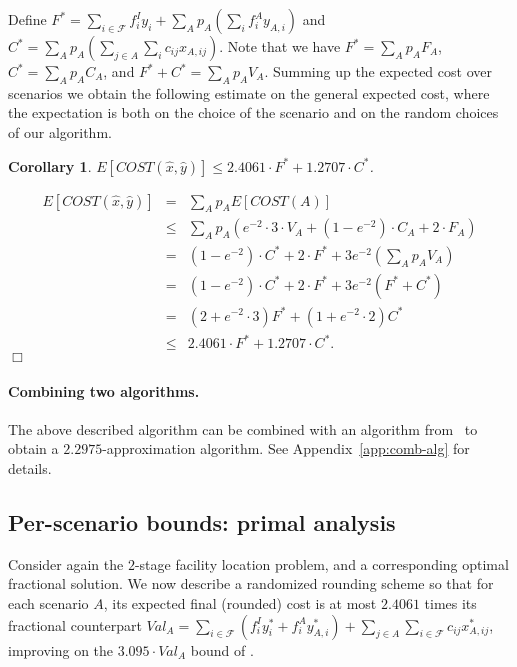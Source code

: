 \documentclass[11pt]{article}
\newtheorem{corollary}[theorem]{\indent Corollary}
\newcommand{\qed}{\nopagebreak \hfill $\Box$}
\newenvironment{proof}{\par \noindent {\em Proof:}}{\qed \par}
\newcommand{\F}{\mathcal{F}}
\begin{document}
Define $F^* = \sum_{i \in \mathcal{F}} f_i^I y_i +
\sum_A p_A (\sum_i f_i^A y_{A,i})$
and $C^* = \sum_A p_A (\sum_{j \in A} \sum_i c_{ij} x_{A,ij})$.
Note that we have $F^* = \sum_A p_A F_A$, $C^* = \sum_A p_A C_A$, and
$F^*+C^* = \sum_A p_A V_A$.
Summing up the expected cost over scenarios we obtain the following
estimate on the general expected cost, where the expectation is both 
on the choice of the scenario and on the random choices of our algorithm.

\begin{corollary}
 $E[COST(\hat{x},\hat{y})] \leq 2.4061 \cdot F^* + 1.2707 \cdot C^*$.
\end{corollary}

\begin{proof}
\begin{eqnarray*}
 E[COST(\hat{x},\hat{y})]& = & \sum_A p_A E[COST(A)]\\
 & \leq & \sum_A p_A\left( e^{-2} \cdot 3 \cdot V_A + (1-e^{-2}) \cdot C_A + 2 \cdot F_A \right)\\
 & = & (1-e^{-2}) \cdot C^* + 2 \cdot F^* + 3e^{-2} (\sum_A p_A V_A)\\
 & = & (1-e^{-2}) \cdot C^* + 2 \cdot F^* + 3e^{-2} (F^*+C^*)\\
 & = & (2 + e^{-2} \cdot 3) F^* + (1 + e^{-2} \cdot 2) C^* \\
 & \leq & 2.4061 \cdot F^* + 1.2707 \cdot C^*.
\end{eqnarray*}
\end{proof}

\paragraph{Combining two algorithms.}
The above described algorithm can be combined with an algorithm from~\cite{DBLP:conf/soda/Srinivasan07}
to obtain a $2.2975$-approximation algorithm.
See Appendix~\ref{app:comb-alg} for details.



\subsection{Per-scenario bounds: primal analysis}
\label{section:per_scenario}

Consider again the $2$-stage facility location problem, and a corresponding
optimal fractional solution. We now describe a randomized rounding
scheme so that for each scenario $A$, its expected final (rounded)
cost is at most $2.4061$ times its fractional counterpart 
$Val_A = \sum_{i \in \F} (f_i^I y^*_i + f_i^A y^*_{A,i}) + \sum_{j\in A}\sum_{i\in \F} c_{ij}x^*_{A,ij}$,
improving on the $3.095 \cdot Val_A$
bound of \cite{DBLP:conf/soda/Srinivasan07}.
\end{document}
